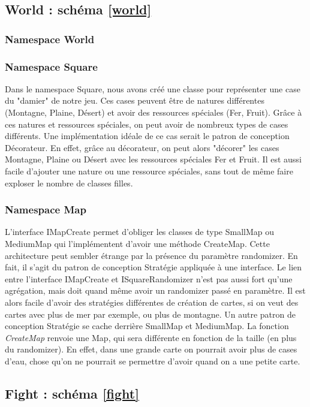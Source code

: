 		
	\subsection{World : schéma \ref{world}}
		\subsubsection{Namespace World}
			\subsubsection{Namespace Square}
				Dans le namespace Square, nous avons créé une classe pour représenter une case du "damier" de notre jeu.
			Ces cases peuvent être de natures différentes (Montagne, Plaine, Désert) et avoir des ressources spéciales (Fer, Fruit).
			Grâce à ces natures et ressources spéciales, on peut avoir de nombreux types de cases différents.
			Une implémentation idéale de ce cas serait le patron de conception Décorateur.
			En effet, grâce au décorateur, on peut alors "décorer" les cases Montagne, Plaine ou Désert avec les ressources spéciales Fer et Fruit.
			Il est aussi facile d'ajouter une nature ou une ressource spéciales, sans tout de même faire exploser le nombre de classes filles.
			
			\subsubsection{Namespace Map}
				L'interface IMapCreate permet d'obliger les classes de type SmallMap ou MediumMap qui l'implémentent d'avoir une méthode CreateMap. Cette architecture peut sembler étrange par la présence du paramètre randomizer.
			En fait, il s'agit du patron de conception Stratégie appliquée à une interface.
			Le lien entre l'interface IMapCreate et ISquareRandomizer n'est pas aussi fort qu'une agrégation, mais doit quand même avoir un randomizer passé en paramètre.
			Il est alors facile d'avoir des stratégies différentes de création de cartes, si on veut des cartes avec plus de mer par exemple, ou plus de montagne.
				Un autre patron de conception Stratégie se cache derrière SmallMap et MediumMap. La fonction \textit{CreateMap} renvoie une Map, qui sera différente en fonction de la taille (en plus du randomizer).
			En effet, dans une grande carte on pourrait avoir plus de cases d'eau, chose qu'on ne pourrait se permettre d'avoir quand on a une petite carte.
	
	\subsection{Fight : schéma \ref{fight}}
